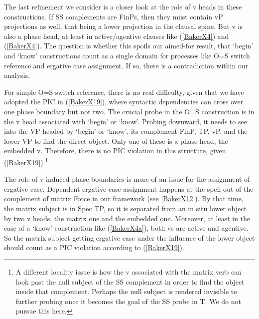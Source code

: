 \documentclass[output=paper]{langscibook}
\begin{document}
The last refinement we consider is a closer look at the role of v heads in these constructions. If SS complements are FinPs, then they must contain vP projections as well, that being a lower projection in the clausal spine. But v is also a phase head, at least in active/agentive clauses like (\ref{BakerX4}) and (\ref{BakerX4}). The question is whether this spoils our aimed-for result, that ‘begin’ and ‘know’ constructions count as a single domain for processes like O=S switch reference and ergative case assignment. If so, there is a contradiction within our analysis.

For simple O=S switch reference, there is no real difficulty, given that we have adopted the PIC in (\ref{BakerX19}), where syntactic dependencies can cross over one phase boundary but not two. The crucial probe in the O=S construction is in the v head associated with ‘begin’ or ‘know’. Probing downward, it needs to see into the VP headed by ‘begin’ or ‘know’, its complement FinP, TP, vP, and the lower VP to find the direct object. Only one of these is a phase head, the embedded v. Therefore, there is no PIC violation in this structure, given (\ref{BakerX19}).\footnote{A different locality issue is how the v associated with the matrix verb can look past the null subject of the SS complement in order to find the object inside that complement. Perhaps the null subject is rendered invisible to further probing once it becomes the goal of the SS probe in T. We do not pursue this here.}

The role of v-induced phase boundaries is more of an issue for the assignment of ergative case. Dependent ergative case assignment happens at the spell out of the complement of matrix Force in our framework (see \ref{BakerX12}). By that time, the matrix subject is in Spec TP, so it is separated from an in situ lower object by two v heads, the matrix one and the embedded one. Moreover, at least in the case of a `know’ construction like (\ref{BakerX4a}), both vs are active and agentive. So the matrix subject getting ergative case under the influence of the lower object should count as a PIC violation according to (\ref{BakerX19}).
\end{document}
